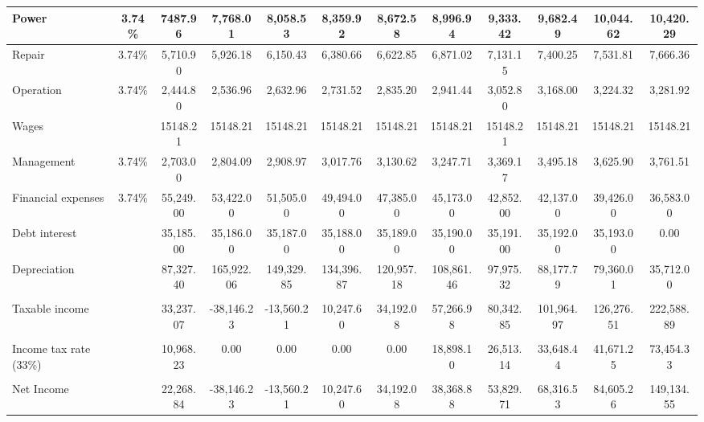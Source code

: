 \documentclass[12pt]{article}
\begin{document}
\begin{landscape}
\begin{table}[htbp]
\begin{tabular}{|p{12.59em}|c|c|c|c|c|c|c|c|c|c|c|}
    \hline
    Power & 3.74\% & 7487.96 & 7,768.01 & 8,058.53 & 8,359.92 & 8,672.58 & 8,996.94 & 9,333.42 & 9,682.49 & 10,044.62 & 10,420.29 \\
    \hline
    Repair & 3.74\% & 5,710.90 & 5,926.18 & 6,150.43 & 6,380.66 & 6,622.85 & 6,871.02 & 7,131.15 & 7,400.25 & 7,531.81 & 7,666.36 \\
    \hline
    Operation & 3.74\% & 2,444.80 & 2,536.96 & 2,632.96 & 2,731.52 & 2,835.20 & 2,941.44 & 3,052.80 & 3,168.00 & 3,224.32 & 3,281.92 \\
    \hline
    Wages &       & 15148.21 & 15148.21 & 15148.21 & 15148.21 & 15148.21 & 15148.21 & 15148.21 & 15148.21 & 15148.21 & 15148.21 \\
    \hline
              Management & 3.74\% & 2,703.00 & 2,804.09 & 2,908.97 & 3,017.76 & 3,130.62 & 3,247.71 & 3,369.17 & 3,495.18 & 3,625.90 & 3,761.51 \\
    \hline
    Financial expenses & 3.74\% & 55,249.00 & 53,422.00 & 51,505.00 & 49,494.00 & 47,385.00 & 45,173.00 & 42,852.00 & 42,137.00 & 39,426.00 & 36,583.00 \\
    \hline
             Debt interest  &       & 35,185.00 & 35,186.00 & 35,187.00 & 35,188.00 & 35,189.00 & 35,190.00 & 35,191.00 & 35,192.00 & 35,193.00 & 0.00 \\
    \hline
              Depreciation &       & 87,327.40 & 165,922.06 & 149,329.85 & 134,396.87 & 120,957.18 & 108,861.46 & 97,975.32 & 88,177.79 & 79,360.01 & 35,712.00 \\
    \hline
    \multicolumn{1}{|c|}{} &       &       &       &       &       &       &       &       &       &       &  \\
    \hline
    Taxable income &       & 33,237.07 & \textcolor[rgb]{ 1,  0,  0}{-38,146.23} & \textcolor[rgb]{ 1,  0,  0}{-13,560.21} & 10,247.60 & 34,192.08 & 57,266.98 & 80,342.85 & 101,964.97 & 126,276.51 & 222,588.89 \\
    \hline
    \multicolumn{1}{|c|}{} &       &       &       &       &       &       &       &       &       &       &  \\
    \hline
    Income tax rate (33\%) &       & 10,968.23 & 0.00  & 0.00  & 0.00  & 0.00  & 18,898.10 & 26,513.14 & 33,648.44 & 41,671.25 & 73,454.33 \\
    \hline
    \multicolumn{1}{|c|}{} &       &       &       &       &       &       &       &       &       &       &  \\
    \hline
    Net Income  &       & 22,268.84 & \textcolor[rgb]{ 1,  0,  0}{-38,146.23} & \textcolor[rgb]{ 1,  0,  0}{-13,560.21} & 10,247.60 & 34,192.08 & 38,368.88 & 53,829.71 & 68,316.53 & 84,605.26 & 149,134.55 \\
    \bottomrule
    \end{tabular}%
  \label{tab:addlabel}%
\end{table}%
\end{landscape}
\end{document}
